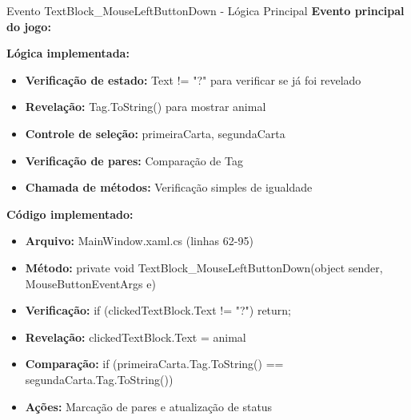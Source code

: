 \documentclass[aspectratio=169]{beamer}
\begin{document}
\begin{frame}{Evento TextBlock\_MouseLeftButtonDown - Lógica Principal}
\textbf{Evento principal do jogo:}

\textbf{Lógica implementada:}
\begin{itemize}
    \item \textbf{Verificação de estado:} Text != "?" para verificar se já foi revelado
    \item \textbf{Revelação:} Tag.ToString() para mostrar animal
    \item \textbf{Controle de seleção:} primeiraCarta, segundaCarta
    \item \textbf{Verificação de pares:} Comparação de Tag
    \item \textbf{Chamada de métodos:} Verificação simples de igualdade
\end{itemize}

\textbf{Código implementado:}
\begin{itemize}
    \item \textbf{Arquivo:} MainWindow.xaml.cs (linhas 62-95)
    \item \textbf{Método:} private void TextBlock\_MouseLeftButtonDown(object sender, MouseButtonEventArgs e)
    \item \textbf{Verificação:} if (clickedTextBlock.Text != "?") return;
    \item \textbf{Revelação:} clickedTextBlock.Text = animal
    \item \textbf{Comparação:} if (primeiraCarta.Tag.ToString() == segundaCarta.Tag.ToString())
    \item \textbf{Ações:} Marcação de pares e atualização de status
\end{itemize}
\end{frame}
\end{document}
